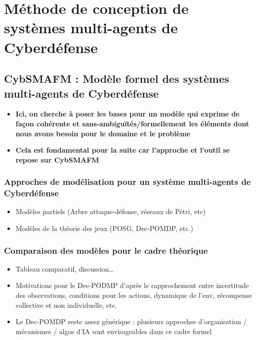 \chapter{Méthode de conception de systèmes multi-agents de Cyberdéfense}\label{ch:cybSMAdm} %

\section{CybSMAFM : Modèle formel des systèmes multi-agents de Cyberdéfense}\label{sec:cybSMAfm}

\begin{itemize}
    \item \textbf{Ici, on cherche à poser les bases pour un modèle qui exprime de façon cohérente et sans-ambiguïtés/formellement les éléments dont nous avons besoin pour le domaine et le problème}
    \item \textbf{Cela est fondamental pour la suite car l'approche et l'outil se repose sur CybSMAFM}
\end{itemize}

\subsection{Approches de modélisation pour un système multi-agents de Cyberdéfense}
\begin{itemize}

    \item Modèles partiels (Arbre attaque-défense, réseaux de Pétri, etc)
    \item Modèles de la théorie des jeux (POSG, Dec-POMDP, etc.)
\end{itemize}

\subsection{Comparaison des modèles pour le cadre théorique}
\begin{itemize}

    \item Tableau comparatif, discussion…
    \item Motivations pour le Dec-PODMP d'après le rapprochement entre incertitude des observations, conditions pour les actions, dynamique de l'env, récompense collective et non individuelle, etc.
    \item Le Dec-POMDP reste assez générique : plusieurs approches d'organisation / mécanismes / algos d'IA sont envisageables dans ce cadre formel
\end{itemize}

